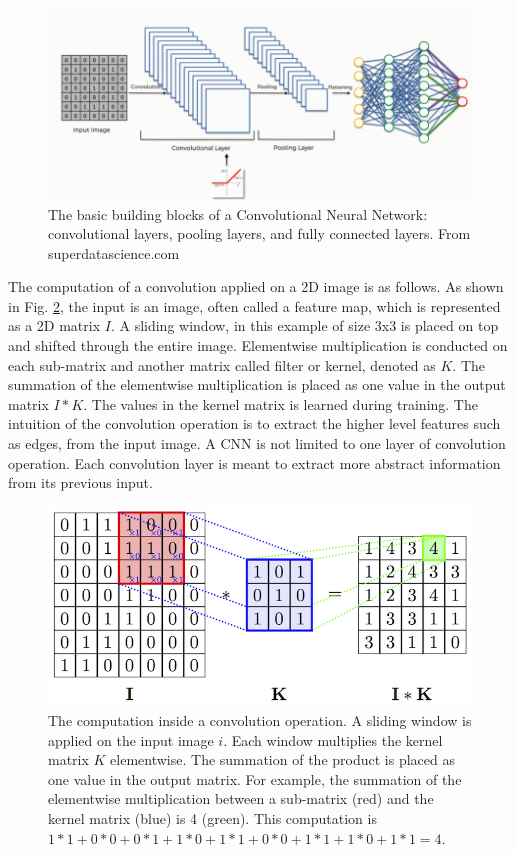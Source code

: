 \begin{figure}[h!]
\begin{center}
\includegraphics[width = 13cm]{img/convlution.png}
\caption{The basic building blocks of a Convolutional Neural Network: convolutional layers, pooling layers, and fully connected layers. From superdatascience.com \label{fig_CNN}}
\end{center}
\end{figure}

The computation of a convolution applied on a 2D image is as follows. As shown in Fig. \ref{fig_Conv2d}, the input is an image, often called a feature map, which is represented as a 2D matrix $I$. A sliding window, in this example of size 3x3 is placed on top and shifted through the entire image. Elementwise multiplication is conducted on each sub-matrix and another matrix called filter or kernel, denoted as $K$. The summation of the elementwise multiplication is placed as one value in the output matrix $I*K$. The values in the kernel matrix is learned during training. The intuition of the convolution operation is to extract the higher level features such as edges, from the input image. A CNN is not limited to one layer of convolution operation. Each convolution layer is meant to extract more abstract information from its previous input.
\begin{figure}[h!]
\begin{center}
\includegraphics[width = 13cm]{img/convolution_computation.png}
\caption{The computation inside a convolution operation. A sliding window is applied on the input image $i$. Each window multiplies the kernel matrix $K$ elementwise. The summation of the product is placed as one value in the output matrix. For example, the summation of the elementwise multiplication between a sub-matrix (red) and the kernel matrix (blue) is 4 (green). This computation is $1*1+0*0+0*1+1*0+1*1+0*0+1*1+1*0+1*1 = 4$.   \label{fig_Conv2d}}
\end{center}
\end{figure}


